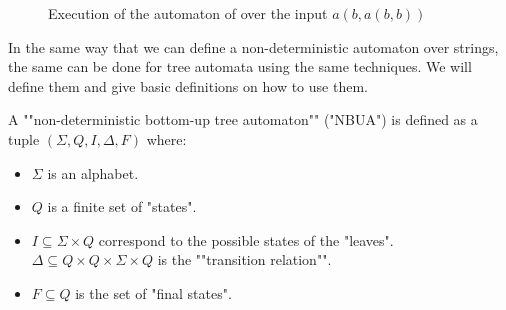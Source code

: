 \documentclass[a4paper,UKenglish,cleveref, autoref, thm-restate]{lipics-v2021}
\begin{document}
\begin{figure}[h]\label{fig:count-leaves}
	\centering
	\caption{Execution of the automaton of  over the input $a(b,a(b,b))$}
\end{figure}




In the same way that we can define a non-deterministic automaton over strings, the same can be done for
tree automata using the same techniques. We will define them and give basic definitions on how to use them.

\begin{definition}
	\AP A ""non-deterministic bottom-up tree automaton"" (\reintro* "NBUA") is defined as a tuple
	$(\Sigma, Q, I, \Delta, F)$ where:
	\begin{itemize}
		\item $\Sigma$ is an alphabet.
		\item $Q$ is a finite set of "states".
		\item $I \subseteq \Sigma \times Q$ correspond to the possible states of the "leaves".
		      \itemAP $\Delta \subseteq Q \times Q \times \Sigma \times Q$ is the ""transition relation"".
		\item $F \subseteq Q$ is the set of "final states".
	\end{itemize}
\end{definition}
\end{document}
